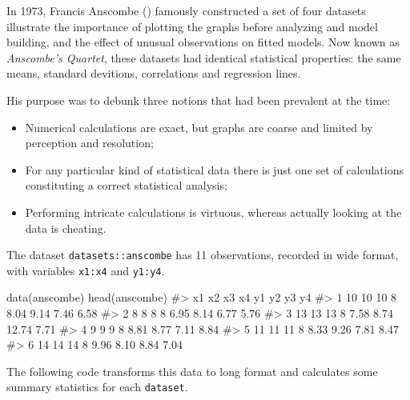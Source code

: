 \documentclass[
  letterpaper,
  10pt,
  krantz2]{krantz}
\makeatletter
\newenvironment{Shaded}{\begin{snugshade}}{\end{snugshade}}
\newcommand{\CommentTok}[1]{\textcolor[rgb]{0.37,0.37,0.37}{#1}}
\newcommand{\FunctionTok}[1]{\textcolor[rgb]{0.28,0.35,0.67}{#1}}
\newcommand{\NormalTok}[1]{\textcolor[rgb]{0.00,0.23,0.31}{#1}}
\providecommand{\tightlist}{%
  \setlength{\itemsep}{0pt}\setlength{\parskip}{0pt}}\usepackage{longtable,booktabs,array}
\newenvironment{kframe}{%
  \medskip{}
  \setlength{\fboxsep}{.8em}
  \def\at@end@of@kframe{}%
  \ifinner\ifhmode%
  \def\at@end@of@kframe{\end{minipage}}%
  \begin{minipage}{\columnwidth}%
  \fi\fi%
  \def\FrameCommand##1{\hskip\@totalleftmargin \hskip-\fboxsep
  \colorbox{shadecolor}{##1}\hskip-\fboxsep
      \hskip-\linewidth \hskip-\@totalleftmargin \hskip\columnwidth}%
  \MakeFramed {\advance\hsize-\width
    \@totalleftmargin\z@ \linewidth\hsize
    \@setminipage}}%
{\par\unskip\endMakeFramed%
  \at@end@of@kframe}
\renewenvironment{Shaded}{\begin{kframe}}{\end{kframe}}
\makeatother
\begin{document}
In 1973, Francis Anscombe ()
famously constructed a set of four datasets illustrate the importance of
plotting the graphs before analyzing and model building, and the effect
of unusual observations on fitted models. Now known as \emph{Anscombe's
Quartet}, these datasets had identical statistical properties: the same
means, standard devitions, correlations and regression lines.

His purpose was to debunk three notions that had been prevalent at the
time:

\begin{itemize}
\tightlist
\item
  Numerical calculations are exact, but graphs are coarse and limited by
  perception and resolution;
\item
  For any particular kind of statistical data there is just one set of
  calculations constituting a correct statistical analysis;
\item
  Performing intricate calculations is virtuous, whereas actually
  looking at the data is cheating.
\end{itemize}

The dataset \texttt{datasets::anscombe} has 11 observations, recorded in
wide format, with variables \texttt{x1:x4} and \texttt{y1:y4}.

\begin{Shaded}
\begin{Highlighting}[]
\FunctionTok{data}\NormalTok{(anscombe) }
\FunctionTok{head}\NormalTok{(anscombe)}
\CommentTok{\#\textgreater{}   x1 x2 x3 x4   y1   y2    y3   y4}
\CommentTok{\#\textgreater{} 1 10 10 10  8 8.04 9.14  7.46 6.58}
\CommentTok{\#\textgreater{} 2  8  8  8  8 6.95 8.14  6.77 5.76}
\CommentTok{\#\textgreater{} 3 13 13 13  8 7.58 8.74 12.74 7.71}
\CommentTok{\#\textgreater{} 4  9  9  9  8 8.81 8.77  7.11 8.84}
\CommentTok{\#\textgreater{} 5 11 11 11  8 8.33 9.26  7.81 8.47}
\CommentTok{\#\textgreater{} 6 14 14 14  8 9.96 8.10  8.84 7.04}
\end{Highlighting}
\end{Shaded}

The following code transforms this data to long format and calculates
some summary statistics for each \texttt{dataset}.
\end{document}
